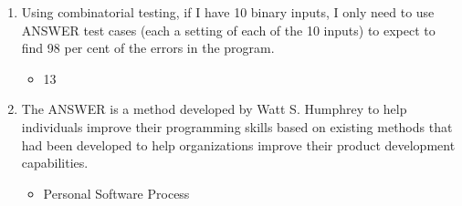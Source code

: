 \documentclass{exam}
\begin{document}
\begin{enumerate}
\item Using combinatorial testing, if I have 10 binary inputs, I only need to use ANSWER test cases (each a setting of each of the 10 inputs) to expect to find 98 per cent of the errors in the program.
\begin{itemize}
\item 13
\end{itemize}
\item The ANSWER is a method developed by Watt S. Humphrey to help individuals improve their programming skills based on existing methods that had been developed to help organizations improve their product development capabilities.
\begin{itemize}
\item Personal Software Process
\end{itemize}
\end{enumerate}
\end{document}
